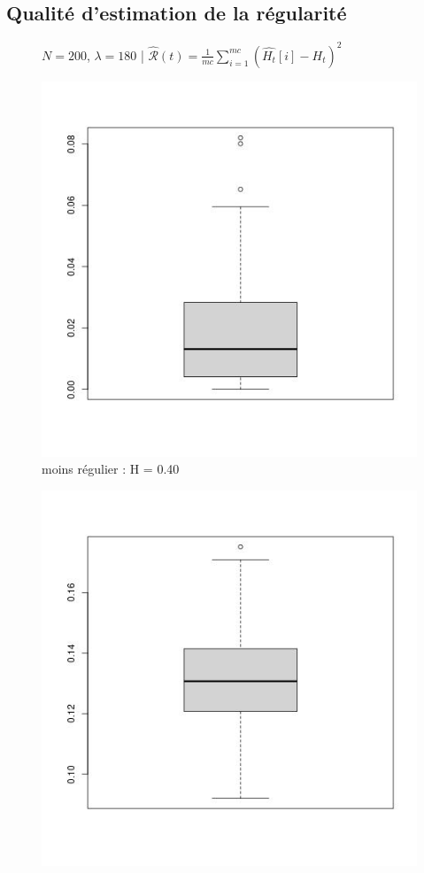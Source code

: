 \subsection{Qualité d'estimation de la régularité}

\begin{figure}[H]
	\centering
	$N = 200$, $\lambda = 180$ | $\widehat{\mathcal R}(t) = \frac 1 {mc} \sum\limits_{i=1}^{mc} (\widehat{H_t}[i] - H_t)^2$

	\centering
	\noindent\begin{minipage}{0.32\linewidth}
		\centering
		\includegraphics[width=\textwidth]{Images/N200_lbd180_box3_2.jpg}
		moins régulier : H = 0.40
	\end{minipage}
	\begin{minipage}{0.32\linewidth}
		\centering
		\includegraphics[width=\textwidth]{Images/N200_lbd180_box6_2.jpg}

\end{minipage}
\end{figure}
